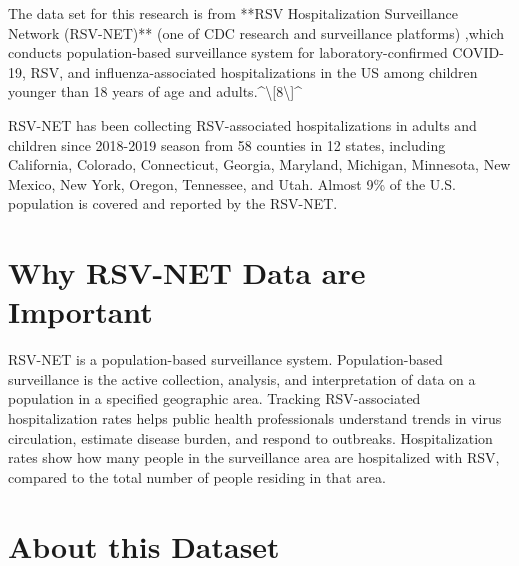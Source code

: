 \documentclass[
  letterpaper,
  DIV=11,
  numbers=noendperiod]{scrreport}
\begin{document}
The data set for this research is from **RSV Hospitalization
Surveillance Network (RSV-NET)** (one of CDC research and surveillance
platforms) ,which conducts population-based surveillance system for
laboratory-confirmed COVID-19, RSV, and influenza-associated
hospitalizations in the US among children younger than 18 years of age
and adults.\^{}\textbackslash{[}8\textbackslash{]}\^{}

RSV-NET has been collecting RSV-associated hospitalizations in adults
and children since 2018-2019 season from 58 counties in 12 states,
including California, Colorado, Connecticut, Georgia, Maryland,
Michigan, Minnesota, New Mexico, New York, Oregon, Tennessee, and Utah.
Almost 9\% of the U.S. population is covered and reported by the
RSV-NET.

\hypertarget{why-rsv-net-data-are-important}{%
\section{Why RSV-NET Data are
Important}\label{why-rsv-net-data-are-important}}

RSV-NET is a population-based surveillance system. Population-based
surveillance is the active collection, analysis, and interpretation of
data on a population in a specified geographic area. Tracking
RSV-associated hospitalization rates helps public health professionals
understand trends in virus circulation, estimate disease burden, and
respond to outbreaks. Hospitalization rates show how many people in the
surveillance area are hospitalized with RSV, compared to the total
number of people residing in that area.

\hypertarget{about-this-dataset}{%
\section{About this Dataset}\label{about-this-dataset}}
\end{document}
